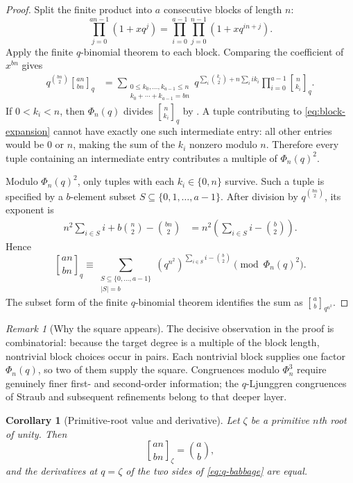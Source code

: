 \documentclass[11pt,oneside,openany]{book}
\newtheorem{corollary}[theorem]{Corollary}
\theoremstyle{definition}
\theoremstyle{remark}
\newtheorem{remark}[theorem]{Remark}
\newcommand{\Qbinom}[3]{\genfrac{[}{]}{0pt}{}{#1}{#2}_{#3}}
\newcommand{\abs}[1]{\lvert #1\rvert}
\begin{document}
\begin{proof}
Split the finite product into $a$ consecutive blocks of length $n$:
\[
 \prod_{j=0}^{an-1}(1+xq^j)
 =\prod_{i=0}^{a-1}\prod_{j=0}^{n-1}(1+xq^{in+j}).
\]
Apply the finite $q$-binomial theorem to each block.  Comparing the coefficient of $x^{bn}$ gives
\begin{align}
 q^{\binom{bn}{2}}\Qbinom{an}{bn}{q}
 &=\sum_{\substack{0\le k_0,\ldots,k_{a-1}\le n\\
                    k_0+\cdots+k_{a-1}=bn}}
 q^{\sum_i\binom{k_i}{2}+n\sum_i i k_i}
 \prod_{i=0}^{a-1}\Qbinom n{k_i}q.
 \tag{16.10}\label{eq:block-expansion}
\end{align}
If $0<k_i<n$, then $\Phi_n(q)$ divides $\Qbinom n{k_i}q$ by .  A tuple contributing to \eqref{eq:block-expansion} cannot have exactly one such intermediate entry: all other entries would be $0$ or $n$, making the sum of the $k_i$ nonzero modulo $n$.  Therefore every tuple containing an intermediate entry contributes a multiple of $\Phi_n(q)^2$.

Modulo $\Phi_n(q)^2$, only tuples with each $k_i\in\{0,n\}$ survive.  Such a tuple is specified by a $b$-element subset $S\subseteq\{0,1,\ldots,a-1\}$.  After division by $q^{\binom{bn}{2}}$, its exponent is
\begin{align*}
 n^2\sum_{i\in S}i+b\binom n2-\binom{bn}{2}
 &=n^2\left(\sum_{i\in S}i-\binom b2\right).
\end{align*}
Hence
\[
 \Qbinom{an}{bn}{q}
 \equiv
 \sum_{\substack{S\subseteq\{0,\ldots,a-1\}\\\abs S=b}}
 (q^{n^2})^{\sum_{i\in S}i-\binom b2}
 \pmod{\Phi_n(q)^2}.
\]
The subset form of the finite $q$-binomial theorem identifies the sum as $\Qbinom ab{q^{n^2}}$.
\end{proof}

\begin{remark}[Why the square appears]
The decisive observation in the proof is combinatorial: because the target degree is a multiple of the block length, nontrivial block choices occur in pairs.  Each nontrivial block supplies one factor $\Phi_n(q)$, so two of them supply the square.  Congruences modulo $\Phi_n^3$ require genuinely finer first- and second-order information; the $q$-Ljunggren congruences of Straub and subsequent refinements belong to that deeper layer.
\end{remark}

\begin{corollary}[Primitive-root value and derivative]\label{cor:babbage-derivative}
Let $\zeta$ be a primitive $n$th root of unity.  Then
\[
 \Qbinom{an}{bn}{\zeta}=\binom ab,
\]
and the derivatives at $q=\zeta$ of the two sides of \eqref{eq:q-babbage} are equal.
\end{corollary}
\end{document}
